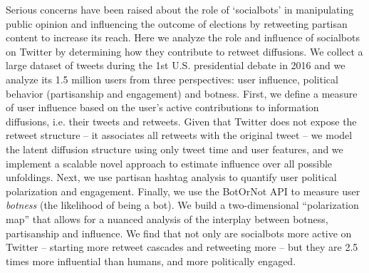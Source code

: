 %
Serious concerns have been raised about the role of `socialbots' in manipulating public opinion and influencing the outcome of elections by retweeting partisan content to increase its reach.
Here we analyze the role and influence of socialbots on Twitter by determining how they contribute to retweet diffusions.
We collect a large dataset of tweets during the 1st U.S. presidential debate in 2016 and we analyze its 1.5 million users from three perspectives: user influence, political behavior (partisanship and engagement) and botness.
First, we define a measure of user influence based on the user's active contributions to information diffusions, i.e. their tweets and retweets. 
Given that Twitter does not expose the retweet structure -- it associates all retweets with the original tweet --
we model the latent diffusion structure using only tweet time and user features, and we implement a scalable novel approach to estimate influence over all possible unfoldings.
Next, we use partisan hashtag analysis to quantify user political polarization and engagement.
Finally, we use the BotOrNot API to measure user \emph{botness} (the likelihood of being a bot).
We build a two-dimensional ``polarization map'' that allows for a nuanced analysis of the interplay between botness, partisanship and influence.
We find that not only are socialbots more active on Twitter -- starting more retweet cascades and retweeting more -- but they are 2.5 times more influential than humans, and more politically engaged. 
